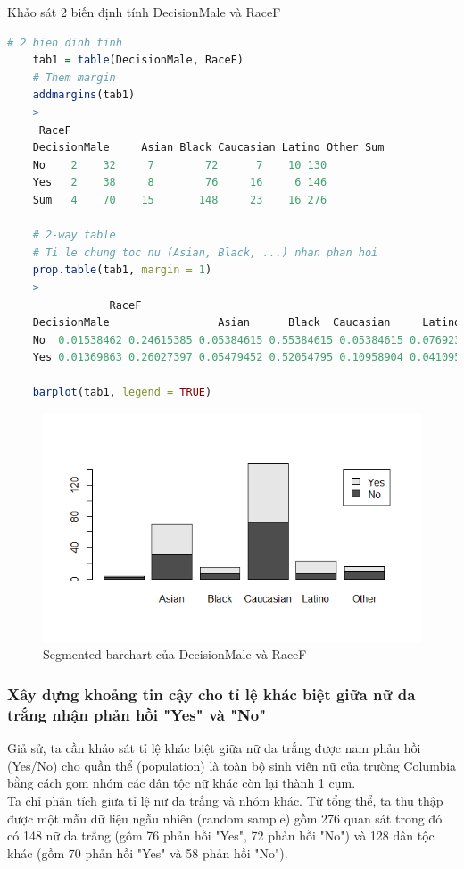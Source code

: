 \documentclass[a4paper,12pt]{article}
\begin{document}
	Khảo sát 2 biến định tính DecisionMale và RaceF
	
	\begin{lstlisting}[language=R]
	# 2 bien dinh tinh
	tab1 = table(DecisionMale, RaceF)
	# Them margin
	addmargins(tab1)
	>
	 RaceF
	DecisionMale     Asian Black Caucasian Latino Other Sum
	No    2    32     7        72      7    10 130
	Yes   2    38     8        76     16     6 146
	Sum   4    70    15       148     23    16 276
	
	# 2-way table
	# Ti le chung toc nu (Asian, Black, ...) nhan phan hoi
	prop.table(tab1, margin = 1)
	>
	            RaceF
	DecisionMale                 Asian      Black  Caucasian     Latino      Other
	No  0.01538462 0.24615385 0.05384615 0.55384615 0.05384615 0.07692308
	Yes 0.01369863 0.26027397 0.05479452 0.52054795 0.10958904 0.04109589
	
	barplot(tab1, legend = TRUE)
	\end{lstlisting}
	\begin{figure}[H]
		\centering
		\includegraphics[width=0.7\linewidth]{Rplot4}
		\caption{Segmented barchart của DecisionMale và RaceF}
		\label{fig:rplot4}
	\end{figure}
	

	
	\subsubsection{Xây dựng khoảng tin cậy cho tỉ lệ khác biệt giữa nữ da trắng nhận phản hồi "Yes" và "No"}
		Giả sử, ta cần khảo sát tỉ lệ khác biệt giữa nữ da trắng được nam phản hồi (Yes/No) cho quần thể (population) là toàn bộ sinh viên nữ của trường Columbia bằng cách gom nhóm các dân tộc nữ khác còn lại thành 1 cụm.\\
		
		Ta chỉ phân tích giữa tỉ lệ nữ da trắng và nhóm khác. Từ tổng thể, ta thu thập được một mẫu dữ liệu ngẫu nhiên (random sample) gồm 276 quan sát trong đó có 148 nữ da trắng (gồm 76 phản hồi "Yes", 72 phản hồi "No") và 128 dân tộc khác (gồm 70 phản hồi "Yes" và 58 phản hồi "No").\\
		
\end{document}
